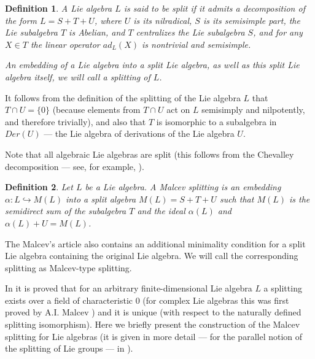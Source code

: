 \documentclass{amsart}
\newtheorem{definition}{Definition}
\begin{document}
\begin{definition} A Lie algebra $L$ is said to be split if it admits a decomposition of the form $L = S + T + U$, where $U$ is its nilradical, $S$ is its semisimple part, the Lie subalgebra $T$ is Abelian, and $T$ centralizes the Lie subalgebra $S$, and for any $X \in T$ the linear operator $ad_L(X)$ is nontrivial and semisimple.

An embedding of a Lie algebra into a split Lie algebra, as well as this split Lie algebra itself, we will call a splitting of $L$.
\end{definition}

It follows from the definition of the splitting of the Lie algebra $L$ that $T \cap U = \{0 \}$ (because elements from $T\cap U$ act on $L$ semisimply and nilpotently, and therefore trivially), and also that $T$ is isomorphic to a subalgebra in $Der (U)$ --- the Lie algebra of derivations of the Lie algebra $U$.

Note that all algebraic Lie algebras are split (this follows from the Chevalley decomposition --- see, for example, \cite {H}).

\begin{definition} Let $L$ be a Lie algebra. A Malcev splitting is an embedding $\alpha: L \hookrightarrow M(L)$ into a split algebra $M(L) =S+T+U$ such that $M(L)$ is the semidirect sum of the subalgebra $T$ and the ideal $\alpha(L)$ and $\alpha(L) +U=M(L)$.
\end{definition}

The Malcev's article also contains an additional minimality condition for a split Lie algebra containing the original Lie algebra. We will call the corresponding splitting as Malcev-type splitting.


In \cite {G1} it is proved that for an arbitrary finite-dimensional Lie algebra $L$ a splitting exists over a field of characteristic 0 (for complex Lie algebras this was first proved by A.I. Malcev \cite {Ma}) and it is unique (with respect to the naturally defined splitting isomorphism). Here we briefly present the construction of the Malcev splitting for Lie algebras (it is given in more detail --- for the parallel notion of the splitting of Lie groups --- in \cite {G1}).
\end{document}
